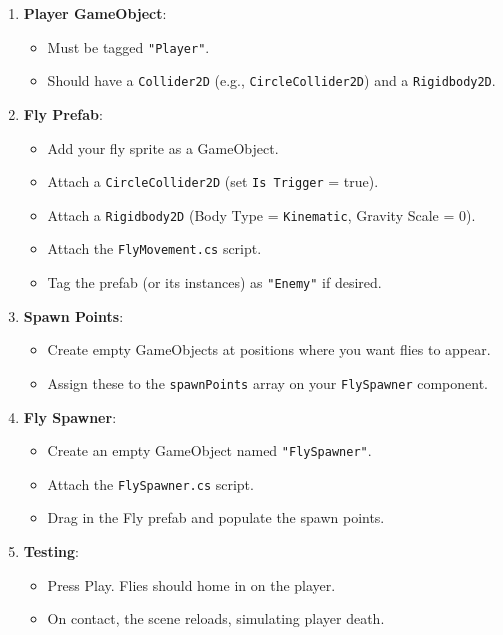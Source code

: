 \documentclass[11pt]{article}
\begin{document}
	\begin{enumerate}[label=\arabic*.]
		\item \textbf{Player GameObject}:
		\begin{itemize}
			\item Must be tagged \texttt{"Player"}.
			\item Should have a \texttt{Collider2D} (e.g., \texttt{CircleCollider2D}) and a \texttt{Rigidbody2D}.
		\end{itemize}
		\item \textbf{Fly Prefab}:
		\begin{itemize}
			\item Add your fly sprite as a GameObject.
			\item Attach a \texttt{CircleCollider2D} (set \texttt{Is Trigger} = true).
			\item Attach a \texttt{Rigidbody2D} (Body Type = \texttt{Kinematic}, Gravity Scale = 0).
			\item Attach the \texttt{FlyMovement.cs} script.
			\item Tag the prefab (or its instances) as \texttt{"Enemy"} if desired.
		\end{itemize}
		\item \textbf{Spawn Points}:
		\begin{itemize}
			\item Create empty GameObjects at positions where you want flies to appear.
			\item Assign these to the \texttt{spawnPoints} array on your \texttt{FlySpawner} component.
		\end{itemize}
		\item \textbf{Fly Spawner}:
		\begin{itemize}
			\item Create an empty GameObject named \texttt{"FlySpawner"}.
			\item Attach the \texttt{FlySpawner.cs} script.
			\item Drag in the Fly prefab and populate the spawn points.
		\end{itemize}
		\item \textbf{Testing}:
		\begin{itemize}
			\item Press Play. Flies should home in on the player.
			\item On contact, the scene reloads, simulating player death.
		\end{itemize}
	\end{enumerate}
	
\end{document}
